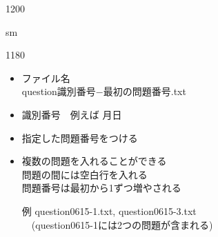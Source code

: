 \documentclass[landscape,10pt]{ujarticle}
\newcommand{\slidepage}[1][s]{%
\setcounter{ketpicctra}{18}%
\if#1m \setcounter{ketpicctra}{1}\fi
\hypersetup{linkcolor=black}%

\begin{layer}{118}{0}
\putnotee{122}{-\theketpicctra.05}{\small\thepage/\pageref{pageend}}
\end{layer}\hypersetup{linkcolor=blue}

}
\begin{document}
\begin{layer}{120}{0}
\end{layer}

\def\mainslidetitley{22}
\def\ketcletter{slidecolora}
\def\ketcbox{slidecolorb}
\def\ketdbox{slidecolorc}
\def\ketcframe{slidecolord}
\def\ketcshadow{slidecolore}
\def\ketdshadow{slidecolorf}
\def\slidetitlex{6}
\def\slidetitlesize{1.3}
\def\mketcletter{slidecolori}
\def\mketcbox{yellow}
\def\mketdbox{yellow}
\def\mketcframe{yellow}
\def\mslidetitlex{62}
\def\mslidetitlesize{2}

\color{black}
\normalsize\bf\boldmath
\addtocounter{page}{-1}

\def\rad{\;\mathrm{rad}}
\newcommand{\hako}[2][6mm]{\fbox{$\mathstrut$\Ctab{#1}{#2}}}
\newcommand{\dint}{\displaystyle\int}
\newcommand{\dlim}{\displaystyle\lim}
\newcommand{\dc}{: \hspace{-1.4mm}:}
%



\vspace*{18mm}

\slidepage
\begin{itemize}
\item
ファイル名\\
\hspace*{2zw}question識別番号$-$最初の問題番号.txt
\item
識別番号　例えば 月日
\item
指定した問題番号をつける
\item
複数の問題を入れることができる\\
\hspace*{2zw}問題の間には空白行を入れる\\
\hspace*{2zw}問題番号は最初から1ずつ増やされる
\item
[例] question0615-1.txt,  question0615-3.txt\\
　(question0615-1には2つの問題が含まれる)
\end{itemize}



\vspace*{18mm}
\end{document}

